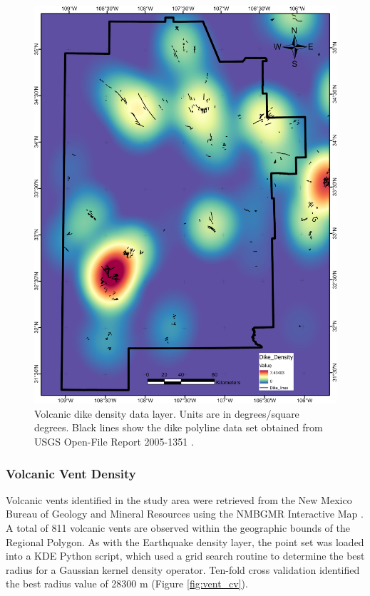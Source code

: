 \begin{figure}[!htp]
\centering
\includegraphics[scale=.50]{templates/images/Figure-DikeDensity.png}
\caption[Volcanic dike data layer]{Volcanic dike density data layer. Units are in degrees/square degrees. Black lines show the dike polyline data set obtained from USGS Open-File Report 2005-1351 \protect\citep{stoeser_new_2005-1}.}
\label{fig:feat_dikes}
\end{figure}

\subsubsection{Volcanic Vent Density}

Volcanic vents identified in the study area were retrieved from the New Mexico Bureau of Geology and Mineral Resources using the NMBGMR Interactive Map \citep{nmbgmr_nmbgmr_2021}. A total of 811 volcanic vents are observed within the geographic bounds of the Regional Polygon. As with the Earthquake density layer, the point set was loaded into a KDE Python script, which used a grid search routine to determine the best radius for a Gaussian kernel density operator. Ten-fold cross validation identified the best radius value of 28300 m (Figure \ref{fig:vent_cv}). 

